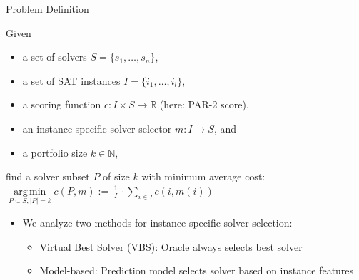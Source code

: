 \documentclass[en]{sdqbeamer}
\DeclareMathOperator*{\argmin}{arg\,min}
\begin{document}
\begin{frame}[t]{Problem Definition}
	\begin{definition}
		\setlength{\leftmargini}{0.4cm} %
		Given
		\pause
		\begin{itemize}
			\itemsep0em
			\item a set of solvers $S = \{s_1, \dots, s_n\}$,
			\pause
			\item a set of SAT instances $I = \{i_1, \dots, i_l\}$,
			\pause
			\item a scoring function $c: I \times S \rightarrow \mathbb{R}$ (here: PAR-2 score),
			\pause
			\item an instance-specific solver selector $m: I \rightarrow S$, and
			\pause
			\item a portfolio size $k \in \mathbb{N}$,
		\end{itemize}
		find a solver subset $P$ of size $k$ with minimum average cost: $\argmin\limits_{P \subseteq S, |P| = k} c(P,m) := \frac{1}{|I|} \cdot \sum\limits_{i \in I}{c(i,m(i))}$
	\end{definition}
	\pause
	\begin{itemize}
		\item We analyze two methods for instance-specific solver selection:
		\begin{itemize}
			\item Virtual Best Solver (VBS): Oracle always selects best solver
			\pause
			\item Model-based: Prediction model selects solver based on instance features
		\end{itemize}
	\end{itemize}
\end{frame}
\end{document}

